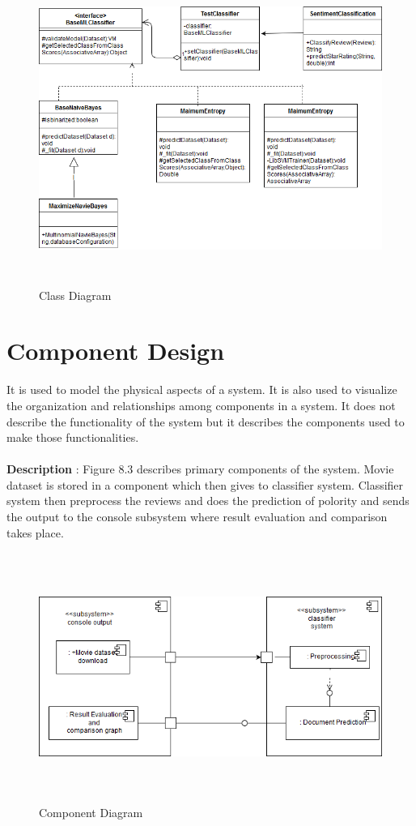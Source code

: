 \documentclass[oneside,a4paper,12pt]{pictreport}
\begin{document}
\begin{figure}[h!]
\includegraphics[width=5.5in,height=4.0in]{class.png}
\caption{Class Diagram}
\end{figure}
\newpage
\section{Component Design}
It is used to model the physical aspects of a system. It is also used to visualize the organization and relationships among components in a system. It does not describe the functionality of the system but it describes the components used to make those functionalities.\\\\
\textbf{Description} : Figure 8.3 describes primary components of the system.
Movie dataset is stored in a component which then gives to classifier system.
Classifier system then preprocess the reviews and does the prediction of polority and sends the output
to the console subsystem where result evaluation and comparison takes place.
\begin{figure}[h!]
\includegraphics[width=5.2in,height=3.2in]{Component_.png}
\caption{Component Diagram}
\end{figure}
\end{document}
